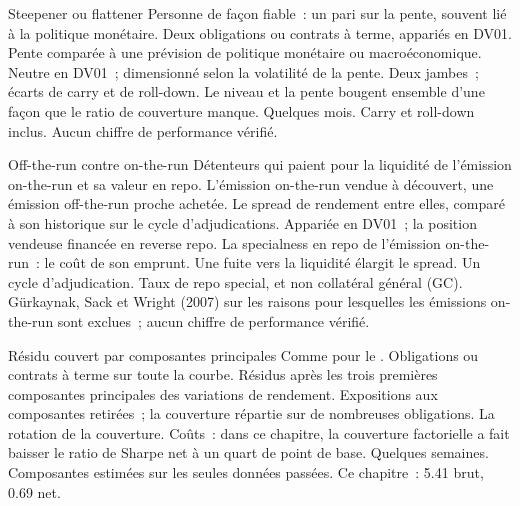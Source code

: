 \begin{strategyfile}{Steepener ou flattener}\label{strat:s2:government-bond-relative-value:curve}
 Personne de façon fiable~: un pari sur la pente, souvent lié à la politique monétaire.
 Deux obligations ou contrats à terme, appariés en DV01.
 Pente comparée à une prévision de politique monétaire ou macroéconomique.
 Neutre en DV01~; dimensionné selon la volatilité de la pente.
 Deux jambes~; écarts de carry et de roll-down.
 Le niveau et la pente bougent ensemble d'une façon que le ratio de couverture manque.
 Quelques mois.
 Carry et roll-down inclus.
 Aucun chiffre de performance vérifié.
\end{strategyfile}

\begin{strategyfile}{Off-the-run contre on-the-run}\label{strat:s2:government-bond-relative-value:otr}
 Détenteurs qui paient pour la liquidité de l'émission on-the-run et sa valeur en repo.
 L'émission on-the-run vendue à découvert, une émission off-the-run proche achetée.
 Le spread de rendement entre elles, comparé à son historique sur le cycle d'adjudications.
 Appariée en DV01~; la position vendeuse financée en reverse repo.
 La specialness en repo de l'émission on-the-run~: le coût de son emprunt.
 Une fuite vers la liquidité élargit le spread.
 Un cycle d'adjudication.
 Taux de repo special, et non collatéral général (GC).
 Gürkaynak, Sack et Wright (2007) sur les raisons pour lesquelles les émissions on-the-run sont exclues~; aucun chiffre de performance vérifié.
\end{strategyfile}

\begin{strategyfile}{Résidu couvert par composantes principales}\label{strat:s2:government-bond-relative-value:pca}
 Comme pour le .
 Obligations ou contrats à terme sur toute la courbe.
 Résidus après les trois premières composantes principales des variations de rendement.
 Expositions aux composantes retirées~; la couverture répartie sur de nombreuses obligations.
 La rotation de la couverture.
 Coûts~: dans ce chapitre, la couverture factorielle a fait baisser le ratio de Sharpe net à un quart de point de base.
 Quelques semaines.
 Composantes estimées sur les seules données passées.
 Ce chapitre~: 5.41 brut, 0.69 net.
\end{strategyfile}

